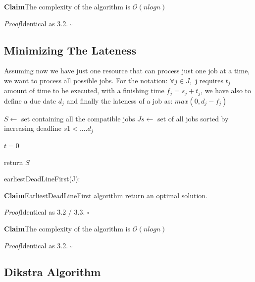 \documentclass[11pt]{article}
\newenvironment{claim}[1]{\par\textbf{Claim}\space#1}{}
\newenvironment{proof}[1]{\\\par\textit{Proof}\space#1}{\hfill\ensuremath{\square}}
\begin{document}
\begin{claim}
The complexity of the algorithm is $\mathcal{O}{(nlogn)}$
\end{claim}
\begin{proof}
Identical as 3.2.
\end{proof}\\

\subsection{Minimizing The Lateness}
Assuming now we have just one resource that can process just one job at a time, we want to process all possible jobs. For the notation: $\forall j \in J,$ j requires  $t_{j}$ amount  of time to be executed, with a finishing time $f_{j} = s_{j} + t_{j}$, we have also to define a due date $d_{j}$ and finally the lateness of a job as: $max (0,d_{j}-f_{j})$

\begin{algorithm}[H]
\SetAlgoLined
\small
{}
\BlankLine

$S \leftarrow$ set containing all the compatible jobs\;
$Js \leftarrow$ set of all jobs sorted by increasing deadline $s1 < .... d_{j}$

\BlankLine
$t = 0 $\;

\BlankLine

return $S$\;
\caption{earliestDeadLineFirst(J):}
\end{algorithm}

\begin{claim}
EarliestDeadLineFirst algorithm return an optimal solution.
\end{claim}
\begin{proof}
Identical as 3.2 / 3.3.
\end{proof}\\
 
\begin{claim}
The complexity of the algorithm is $\mathcal{O}{(nlogn)}$
\end{claim}
\begin{proof}
Identical as 3.2.
\end{proof}\\

\clearpage

\subsection{Dikstra Algorithm}
\end{document}
